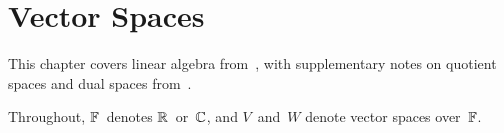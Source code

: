 %
%
%
\chapter{Vector Spaces}
This chapter covers linear algebra from~\cite{axler97}, with supplementary notes on quotient spaces and dual spaces from~\cite{friedberg03}.

Throughout, \(\mathbb{F}\)~denotes \(\mathbb{R}\)~or~\(\mathbb{C}\), and \(V\)~and~\(W\) denote vector spaces over~\(\mathbb{F}\).










